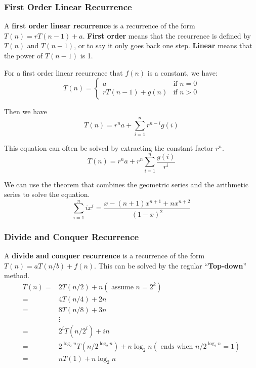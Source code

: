 \documentclass[a4paper,12pt]{article}
\begin{document}
\subsubsection{First Order Linear Recurrence}

A \textbf{first order linear recurrence} is a recurrence of the form $T(n) = rT(n-1) + a$.
\textbf{First order} means that the recurrence is defined by $T(n)$ and $T(n-1)$, or to say it only goes back one step.
\textbf{Linear} means that the power of $T(n-1)$ is 1.

For a first order linear recurrence that $f(n)$ is a constant, we have:
\begin{equation*}
	T(n) = 
	\begin{cases}
		a & \text{if } n = 0 \\
		rT(n-1) + g(n) & \text{if } n > 0
	\end{cases}
\end{equation*}

Then we have
\begin{equation*}
	T(n) = r^n a + \sum_{i=1}^{n} r^{n-i} g(i)
\end{equation*}

This equation can often be solved by extracting the constant factor $r^n$.
\begin{equation*}
	T(n) = r^n a + r^n \sum_{i=1}^{n} \frac{g(i)}{r^i}
\end{equation*}

We can use the theorem that combines the geometric series and the arithmetic series to solve the equation.
\begin{equation*}
	\sum_{i=1}^{n} ix^i = \frac{x - (n+1)x^{n+1} + nx^{n+2}}{(1-x)^2}
\end{equation*}

\subsubsection{Divide and Conquer Recurrence}

A \textbf{divide and conquer recurrence} is a recurrence of the form $T(n) = aT(n/b) + f(n)$.
This can be solved by the regular ``\textbf{Top-down}'' method.
\begin{align*}
	T(n) =& 2T(n/2) + n (\text{ assume } n = 2^k ) \\
	=& 4T(n/4) + 2n \\
	=& 8T(n/8) + 3n \\
	&\vdots \\
	=& 2^i T(n/2^i) + in \\
	=& 2^{\log_2 n} T(n/2^{\log_2 n}) + n \log_2 n (\text{ ends when } n/2^{\log_2 n} = 1) \\
	=& nT(1) + n \log_2 n \\
\end{align*}
\end{document}
